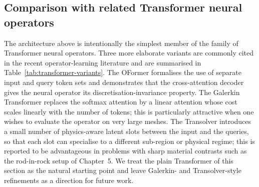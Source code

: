 \subsection{Comparison with related Transformer neural operators}

The architecture above is intentionally the simplest member of the
family of Transformer neural operators. Three more elaborate variants
are commonly cited in the recent operator-learning literature and are
summarised in Table~\ref{tab:transformer-variants}. The OFormer
\cite{liNeuralOperator2023} formalises the use of separate input and
query token sets and demonstrates that the cross-attention decoder
gives the neural operator its discretisation-invariance property. The
Galerkin Transformer \cite{caoChooseTransformer2021} replaces the
softmax attention by a linear attention whose cost scales linearly
with the number of tokens; this is particularly attractive when one
wishes to evaluate the operator on very large meshes. The Transolver
\cite{wuTransolver2024} introduces a small number of physics-aware
latent slots between the input and the queries, so that each slot can
specialise to a different sub-region or physical regime; this is
reported to be advantageous in problems with sharp material contrasts
such as the rod-in-rock setup of Chapter~5. We treat the plain
Transformer of this section as the natural starting point and leave
Galerkin- and Transolver-style refinements as a direction for future
work.

